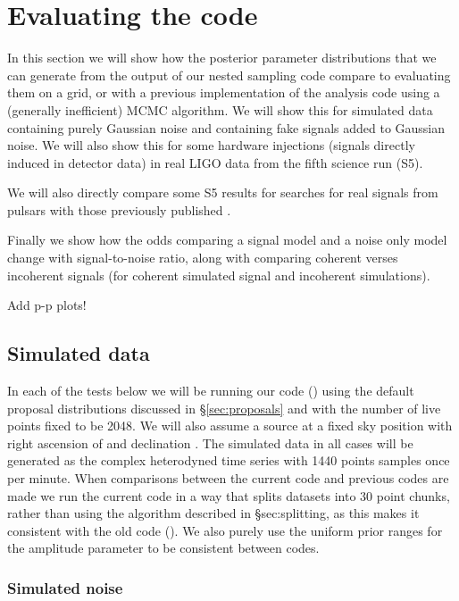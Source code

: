 \section{Evaluating the code}

In this section we will show how the posterior parameter distributions that we can generate from the output
of our nested sampling code compare to evaluating them on a grid, or with a previous implementation of the analysis code
\citep[\lppe used in e.g.][]{2014ApJ...785..119A} using a (generally inefficient) MCMC algorithm. We will show this for
simulated data containing purely Gaussian noise and containing fake signals added to Gaussian noise. We will also
show this for some hardware injections (signals directly induced in detector data) in real LIGO data from the fifth
science run (S5).

We will also directly compare some S5 results for searches for real signals from pulsars with those previously published
\citep{2010ApJ...713..671A}.

Finally we show how the odds comparing a signal model and a noise only model change with signal-to-noise ratio, along
with comparing coherent verses incoherent signals (for coherent simulated signal and incoherent simulations).

Add p-p plots!

\subsection{Simulated data}

In each of the tests below we will be running our code (\lppen) using the default proposal distributions discussed in \S\ref{sec:proposals}
and with the number of live points fixed to be 2048. We will also assume a source at a fixed sky position with right ascension of
 and declination . The simulated data in all cases will be generated as the complex heterodyned
time series with 1440 points samples once per minute. When comparisons between the current code and previous codes are 
made we run the current code in a way that splits datasets into 30 point chunks, rather than using the algorithm described in \S{sec:splitting},
as this makes it consistent with the old code (\lppe). We also purely use the uniform prior ranges for the amplitude parameter to be
consistent between codes.

\subsubsection{Simulated noise}

